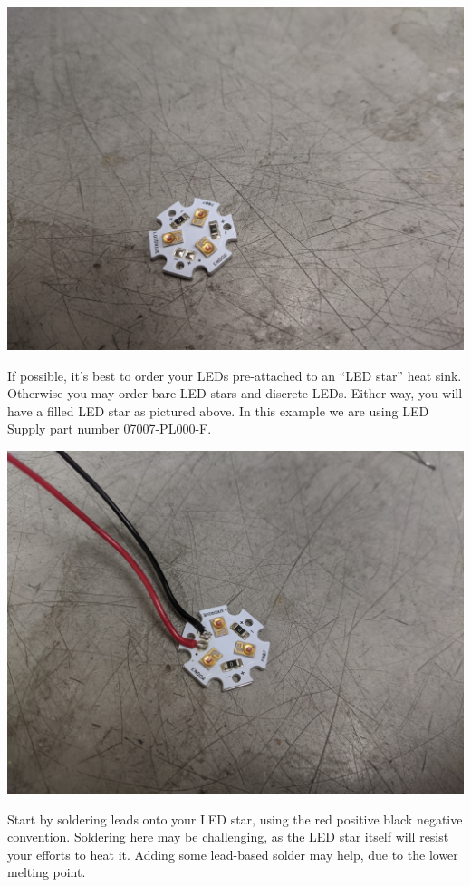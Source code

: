 \documentclass[11pt]{article}
\begin{document}
\begin{center}
  \includegraphics[width=\textwidth/2]{"./bare-led.jpg"}
\end{center}

If possible, it's best to order your LEDs pre-attached to an ``LED star'' heat sink.
Otherwise you may order bare LED stars and discrete LEDs.
Either way, you will have a filled LED star as pictured above.
In this example we are using LED Supply part number 07007-PL000-F.

\begin{center}
  \includegraphics[width=\textwidth/2]{"./soldered-led.jpg"}
\end{center}

Start by soldering leads onto your LED star, using the red positive black negative convention.
Soldering here may be challenging, as the LED star itself will resist your efforts to heat it.
Adding some lead-based solder may help, due to the lower melting point.
\end{document}

